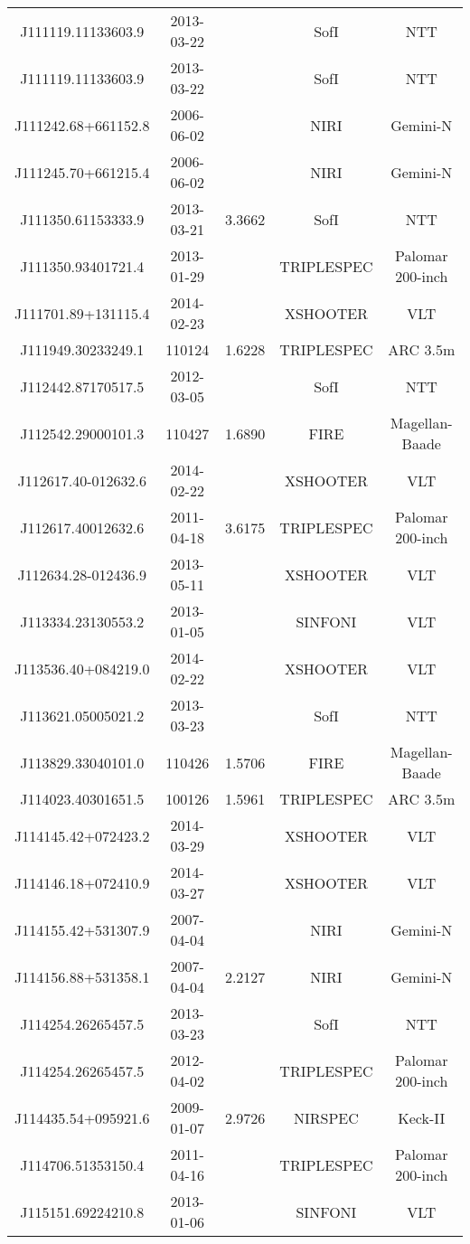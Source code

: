 {\begin{longtable}{ccccc}
J111119.11133603.9 & 2013-03-22 &  & SofI & NTT \\
J111119.11133603.9 & 2013-03-22 &  & SofI & NTT \\
J111242.68+661152.8 & 2006-06-02 &  & NIRI & Gemini-N \\
J111245.70+661215.4 & 2006-06-02 &  & NIRI & Gemini-N \\
J111350.61153333.9 & 2013-03-21 & 3.3662 & SofI & NTT \\
J111350.93401721.4 & 2013-01-29 &  & TRIPLESPEC & Palomar 200-inch \\
J111701.89+131115.4 & 2014-02-23 &  & XSHOOTER & VLT \\
J111949.30233249.1 & 110124 & 1.6228 & TRIPLESPEC & ARC 3.5m \\
J112442.87170517.5 & 2012-03-05 &  & SofI & NTT \\
J112542.29000101.3 & 110427 & 1.6890 & FIRE & Magellan-Baade \\
J112617.40-012632.6 & 2014-02-22 &  & XSHOOTER & VLT \\
J112617.40012632.6 & 2011-04-18 & 3.6175 & TRIPLESPEC & Palomar 200-inch \\
J112634.28-012436.9 & 2013-05-11 &  & XSHOOTER & VLT \\
J113334.23130553.2 & 2013-01-05 &  & SINFONI & VLT \\
J113536.40+084219.0 & 2014-02-22 &  & XSHOOTER & VLT \\
J113621.05005021.2 & 2013-03-23 &  & SofI & NTT \\
J113829.33040101.0 & 110426 & 1.5706 & FIRE & Magellan-Baade \\
J114023.40301651.5 & 100126 & 1.5961 & TRIPLESPEC & ARC 3.5m \\
J114145.42+072423.2 & 2014-03-29 &  & XSHOOTER & VLT \\
J114146.18+072410.9 & 2014-03-27 &  & XSHOOTER & VLT \\
J114155.42+531307.9 & 2007-04-04 &  & NIRI & Gemini-N \\
J114156.88+531358.1 & 2007-04-04 & 2.2127 & NIRI & Gemini-N \\
J114254.26265457.5 & 2013-03-23 &  & SofI & NTT \\
J114254.26265457.5 & 2012-04-02 &  & TRIPLESPEC & Palomar 200-inch \\
J114435.54+095921.6 & 2009-01-07 & 2.9726 & NIRSPEC & Keck-II \\
J114706.51353150.4 & 2011-04-16 &  & TRIPLESPEC & Palomar 200-inch \\
J115151.69224210.8 & 2013-01-06 &  & SINFONI & VLT \\

\end{longtable}}
